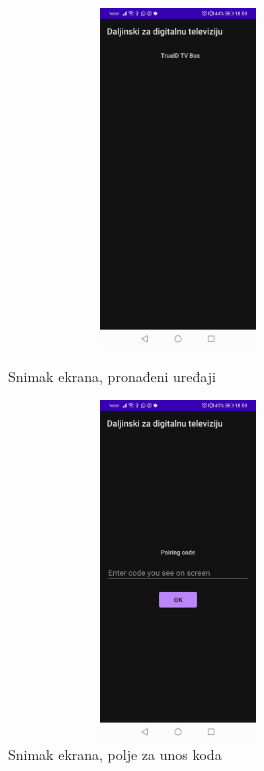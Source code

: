 \documentclass[implementacija.tex]{subfiles}
\begin{document}
\begin{figure}[h!]
\centering
\begin{minipage}{.5\textwidth}
 \centering
  \includegraphics[width=9cm,height=9cm,keepaspectratio]{Implementacija/snimci_ekrana/5_pronadjeni_uredjaji.jpg}
  \caption{Snimak ekrana, pronađeni uređaji}
  \label{fig:pronadjeni_uredjaji}
\end{minipage}%
\begin{minipage}{.5\textwidth}
   \centering
  \includegraphics[width=9cm,height=9cm,keepaspectratio]{Implementacija/snimci_ekrana/6_uparivanje_sa_uredjajem.jpg}
  \caption{Snimak ekrana, polje za unos koda}
  \label{fig:polje_za_kod}
\end{minipage}
\end{figure}
\end{document}
